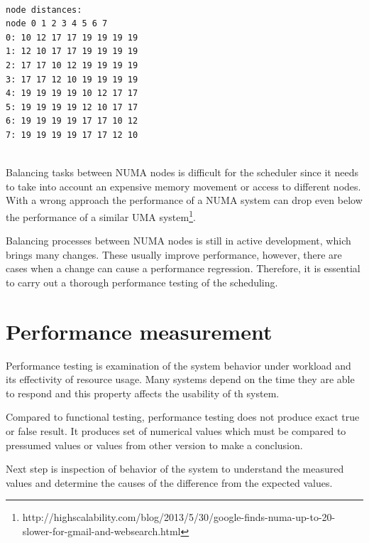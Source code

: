 \begin{minipage}{\linewidth}
\begin{verbatim}

node distances:
node 0 1 2 3 4 5 6 7
0: 10 12 17 17 19 19 19 19
1: 12 10 17 17 19 19 19 19
2: 17 17 10 12 19 19 19 19
3: 17 17 12 10 19 19 19 19
4: 19 19 19 19 10 12 17 17
5: 19 19 19 19 12 10 17 17
6: 19 19 19 19 17 17 10 12
7: 19 19 19 19 17 17 12 10
\end{verbatim}
\end{minipage}\\

Balancing tasks between NUMA nodes is difficult for the scheduler since it needs
to take into account an expensive memory movement or access to different nodes.
With a wrong approach the performance of a NUMA system can drop even below the
performance of a similar UMA
system\footnote{http://highscalability.com/blog/2013/5/30/google-finds-numa-up-to-20-slower-for-gmail-and-websearch.html}.

Balancing processes between NUMA nodes is still in active development, which
brings many changes. These usually improve performance, however, there are cases
when a change can cause a performance regression. Therefore, it is essential to
carry out a thorough performance testing of the scheduling.




\chapter{Performance measurement}
Performance testing is examination of the system behavior under workload and its
effectivity of resource usage. Many systems depend on the time they are able to
respond and this property affects the usability of th system.

Compared to functional testing, performance testing does not produce exact true
or false result. It produces set of numerical values which must be compared to
pressumed values or values from other version to make a conclusion.

Next step is inspection of behavior of the system to understand the measured
values and determine the causes of the difference from the expected values.

